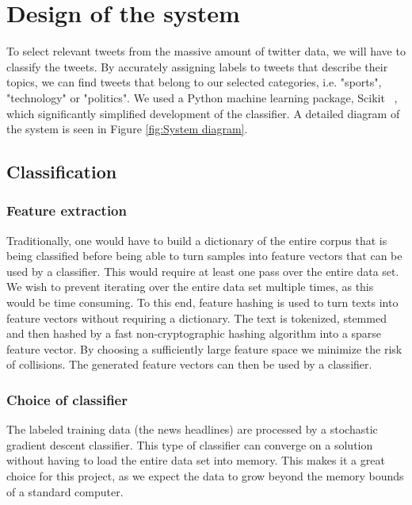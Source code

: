 \documentclass{llncs}
\begin{document}

\section{Design of the system}

To select relevant tweets from the massive amount of twitter data, we will have to classify the tweets. By accurately assigning labels to tweets that describe their topics, we can find tweets that belong to our selected categories, i.e. "sports", "technology" or "politics". We used a Python machine learning package, Scikit ~\cite{scikit-learn}, which significantly simplified development of the classifier. A detailed diagram of the system is seen in Figure \ref{fig:System diagram}. 

\subsection{Classification}

\subsubsection{Feature extraction}
Traditionally, one would have to build a dictionary of the entire corpus that is being classified before being able to turn samples into feature vectors that can be used by a classifier. This would require at least one pass over the entire data set. We wish to prevent iterating over the entire data set multiple times, as this would be time consuming. To this end, feature hashing is used to turn texts into feature vectors without requiring a dictionary. The text is tokenized, stemmed and then hashed by a fast non-cryptographic hashing algorithm into a sparse feature vector. By choosing a sufficiently large feature space we minimize the risk of collisions. The generated feature vectors can then be used by a classifier.

\subsubsection{Choice of classifier}
The labeled training data (the news headlines) are processed by a stochastic gradient descent classifier. This type of classifier can converge on a solution without having to load the entire data set into memory. This makes it a great choice for this project, as we expect the data to grow beyond the memory bounds of a standard computer.
\end{document}
